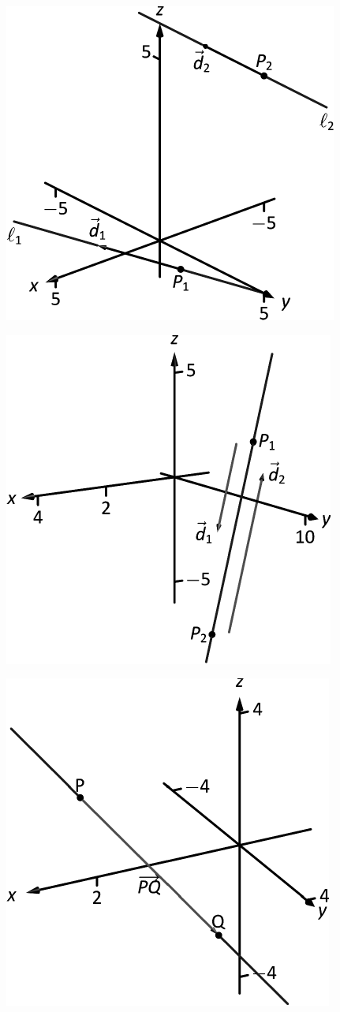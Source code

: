 \documentclass[10pt]{article}
\begin{document}
\includegraphics{figlines2_3DBW.pdf}
\texttt{}

\includegraphics{figlines3_3DBW.pdf}
\texttt{}

\includegraphics{figlines6_3DBW.pdf}
\texttt{}
\end{document}

